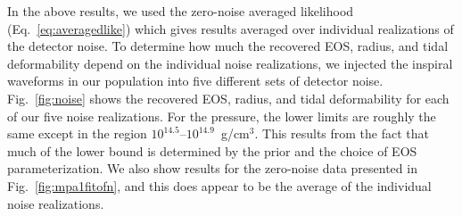 \documentclass[twocolumn,prd,amssymb,aps,nofootinbib,showpacs,epsf]{revtex4}
\newcommand\les[2]{\textcolor{blue}{{#1}\sout{#2}}}
\begin{document}
In the above results, we used the zero-noise averaged likelihood (Eq.~\eqref{eq:averagedlike}) which gives results averaged over individual realizations of the detector noise. To determine how much the recovered EOS, radius, and tidal deformability depend on the individual noise realizations, we injected the inspiral waveforms in our population into five different sets of detector noise. Fig.~\ref{fig:noise} shows the recovered EOS, radius, and tidal deformability for each of our five noise realizations.
For the pressure, the lower limits are roughly the same except in the region $10^{14.5}$--$10^{14.9}$~g/cm$^3$. This results from the fact that much of the lower bound is determined by the prior and the choice of EOS parameterization. We also show results for the zero-noise data presented in Fig.~\ref{fig:mpa1fitofn}, and this does appear to be the average of the individual noise realizations.

\end{document}
